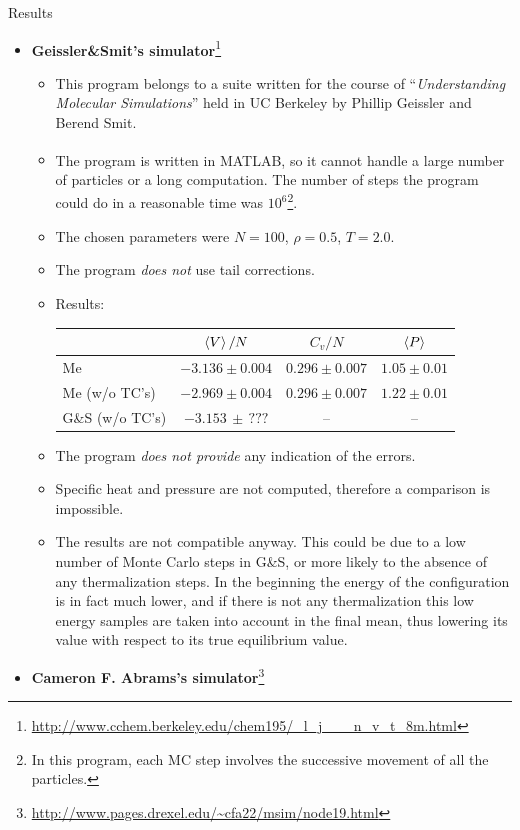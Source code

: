 \documentclass[10pt, compress, protectframetitle, handout]{beamer}
\newcommand{\MATLAB}{MATLAB\textsuperscript{\textregistered}}
\begin{document}
\begin{frame}[allowframebreaks]{Results}
\begin{itemize}
		\item \textbf{Geissler\&Smit's simulator}\footnote{\url{http://www.cchem.berkeley.edu/chem195/_l_j___n_v_t_8m.html}}
		\begin{itemize}
			\item This program belongs to a suite written for the course of ``\textit{Understanding Molecular Simulations}'' held in UC Berkeley by Phillip Geissler and Berend Smit.
			\item The program is written in \MATLAB, so it cannot handle a large number of particles or a long computation. The number of steps the program could do in a reasonable time was $10^6$\footnote{In this program, each MC step involves the successive movement of all the particles.}.
			\item The chosen parameters were $N=100$, $\rho = 0.5$, $T = 2.0$.
			\item The program \emph{does not} use tail corrections.
			\item Results:
			\begin{table}
				\begin{tabular}{lccc}
					\toprule
					 & $\Braket{V}/N$ & $C_v/N$ & $\Braket{P}$ \\
					\midrule
					Me & $-3.136 \pm 0.004$ & $0.296 \pm 0.007$ & $1.05 \pm 0.01$ \\
					Me \scriptsize{(w/o TC's)} & $-2.969 \pm 0.004$ & $0.296 \pm 0.007$ & $1.22 \pm 0.01$ \\
					G\&S \scriptsize{(w/o TC's)} & $-3.153 \, \pm \, ???$ & -- & -- \\
					\bottomrule
				\end{tabular}
			\end{table}
			\item The program \emph{does not provide} any indication of the \alert{errors}.
			\item Specific heat and pressure are not computed, therefore a comparison is impossible.
			\item The results are not compatible anyway. This could be due to a low number of Monte Carlo steps in G\&S, or more likely to the absence of any thermalization steps. In the beginning the energy of the configuration is in fact much lower, and if there is not any thermalization this low energy samples are taken into account in the final mean, thus lowering its value with respect to its true equilibrium value.
		\end{itemize}
		\item \textbf{Cameron F. Abrams's simulator}\footnote{\url{http://www.pages.drexel.edu/~cfa22/msim/node19.html}}

\end{itemize}
\end{frame}
\end{document}
